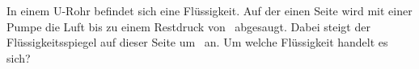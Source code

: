 In einem U-Rohr befindet sich eine Flüssigkeit. Auf der einen Seite wird mit einer Pumpe die Luft bis zu einem Restdruck von \pRO\ abgesaugt. Dabei steigt der Flüssigkeitsspiegel auf dieser Seite um \hstO\ an. Um welche Flüssigkeit handelt es sich?
